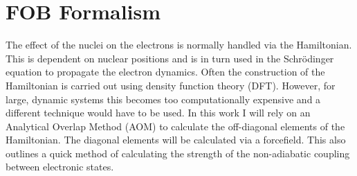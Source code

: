 \chapter{FOB Formalism}
\label{chap:FOB}
The effect of the nuclei on the electrons is normally handled via the Hamiltonian. This is dependent on nuclear positions and is in turn used in the Schr\"odinger equation to propagate the electron dynamics. Often the construction of the Hamiltonian is carried out using density function theory (DFT). However, for large, dynamic systems this becomes too computationally expensive and a different technique would have to be used. In this work I will rely on an Analytical Overlap Method (AOM) \cite{gajdos_ultrafast_2014} to calculate the off-diagonal elements of the Hamiltonian. The diagonal elements will be calculated via a forcefield. This also outlines a quick method of calculating the strength of the non-adiabatic coupling between electronic states.
